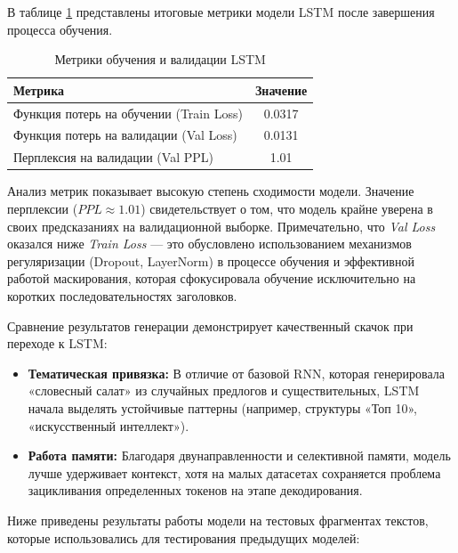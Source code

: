 \documentclass[coursework]{SCWorks}
\begin{document}
    В таблице \ref{tab:lstm_metrics} представлены итоговые метрики модели LSTM после завершения процесса обучения.

    \begin{table}[h!]
        \centering
        \caption{Метрики обучения и валидации LSTM}
        \label{tab:lstm_metrics}
        \begin{tabular}{|l|c|}
            \hline
            \textbf{Метрика}                        & \textbf{Значение} \\ \hline
            Функция потерь на обучении (Train Loss) & 0.0317            \\ \hline
            Функция потерь на валидации (Val Loss)  & 0.0131            \\ \hline
            Перплексия на валидации (Val PPL)       & 1.01              \\ \hline
        \end{tabular}
    \end{table}

    Анализ метрик показывает высокую степень сходимости модели.
    Значение перплексии ($PPL \approx 1.01$) свидетельствует о том, что модель крайне уверена
    в своих предсказаниях на валидационной выборке.
    Примечательно, что \textit{Val Loss} оказался ниже \textit{Train Loss} —
    это обусловлено использованием механизмов регуляризации (Dropout, LayerNorm)
    в процессе обучения и эффективной работой маскирования, которая сфокусировала обучение исключительно
    на коротких последовательностях заголовков.

    Сравнение результатов генерации демонстрирует качественный скачок при переходе к LSTM:
    \begin{itemize}
        \item \textbf{Тематическая привязка:} В отличие от базовой RNN, которая генерировала «словесный салат» из случайных предлогов и существительных, LSTM начала выделять устойчивые паттерны (например, структуры «Топ 10», «искусственный интеллект»).
        \item \textbf{Работа памяти:} Благодаря двунаправленности и селективной памяти, модель лучше удерживает контекст, хотя на малых датасетах сохраняется проблема зацикливания определенных токенов на этапе декодирования.
    \end{itemize}


    Ниже приведены результаты работы модели на тестовых фрагментах текстов, которые использовались для тестирования предыдущих моделей:
\end{document}
